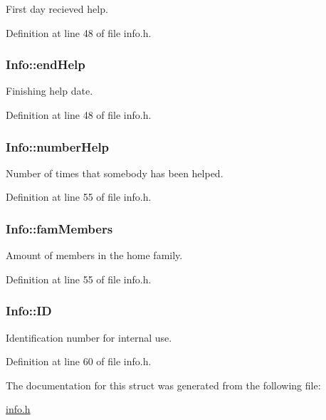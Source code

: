 First day recieved help. 



Definition at line 48 of file info.\+h.

\hypertarget{struct_info_ae81557ef74d11f90fa17f8e2948028a5}{
\subsubsection[{end\+Help}]{\setlength{\rightskip}{0pt plus 5cm}Info\+::end\+Help}}\label{struct_info_ae81557ef74d11f90fa17f8e2948028a5}


Finishing help date. 



Definition at line 48 of file info.\+h.

\hypertarget{struct_info_aa7475a4d5b9b5e8cd5ff698942dee78f}{
\subsubsection[{number\+Help}]{\setlength{\rightskip}{0pt plus 5cm}Info\+::number\+Help}}\label{struct_info_aa7475a4d5b9b5e8cd5ff698942dee78f}


Number of times that somebody has been helped. 



Definition at line 55 of file info.\+h.

\hypertarget{struct_info_ade80df067f691d4120a15ef8dc095a74}{
\subsubsection[{fam\+Members}]{\setlength{\rightskip}{0pt plus 5cm}Info\+::fam\+Members}}\label{struct_info_ade80df067f691d4120a15ef8dc095a74}


Amount of members in the home family. 



Definition at line 55 of file info.\+h.

\hypertarget{struct_info_a0c88224e0958874dd2171d8707cb3a5b}{
\subsubsection[{I\+D}]{\setlength{\rightskip}{0pt plus 5cm}Info\+::\+I\+D}}\label{struct_info_a0c88224e0958874dd2171d8707cb3a5b}


Identification number for internal use. 



Definition at line 60 of file info.\+h.



The documentation for this struct was generated from the following file\+:\begin{DoxyCompactItemize}
\item 
\hyperlink{info_8h}{info.\+h}\end{DoxyCompactItemize}
